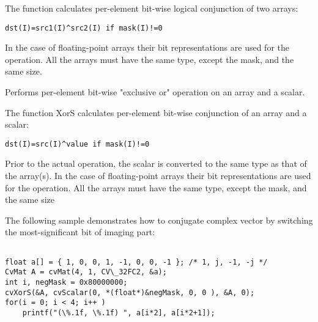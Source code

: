 \begin{description}
\end{description}

The function calculates per-element bit-wise logical conjunction of two arrays:

\begin{lstlisting}
dst(I)=src1(I)^src2(I) if mask(I)!=0
\end{lstlisting}

In the case of floating-point arrays their bit representations are used for the operation. All the arrays must have the same type, except the mask, and the same size.

Performs per-element bit-wise "exclusive or" operation on an array and a scalar.


\begin{description}
\end{description}


The function XorS calculates per-element bit-wise conjunction of an array and a scalar:

\begin{lstlisting}
dst(I)=src(I)^value if mask(I)!=0
\end{lstlisting}

Prior to the actual operation, the scalar is converted to the same type as that of the array(s). In the case of floating-point arrays their bit representations are used for the operation. All the arrays must have the same type, except the mask, and the same size

\ifC
The following sample demonstrates how to conjugate complex vector by switching the most-significant bit of imaging part:

\begin{lstlisting}

float a[] = { 1, 0, 0, 1, -1, 0, 0, -1 }; /* 1, j, -1, -j */
CvMat A = cvMat(4, 1, CV\_32FC2, &a);
int i, negMask = 0x80000000;
cvXorS(&A, cvScalar(0, *(float*)&negMask, 0, 0 ), &A, 0);
for(i = 0; i < 4; i++ )
    printf("(\%.1f, \%.1f) ", a[i*2], a[i*2+1]);

\end{lstlisting}

